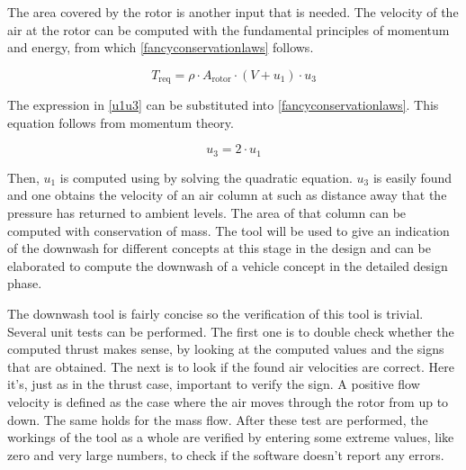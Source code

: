 The area covered by the rotor is another input that is needed. The velocity of the air at the rotor can be computed with the fundamental principles of momentum and energy, from which \autoref{fancyconservationlaws} follows.

\begin{equation}
\label{fancyconservationlaws}
    T_\text{req} = \rho\cdot A_\text{rotor}\cdot(V + u_1)\cdot u_3 
\end{equation}



The expression in \autoref{u1u3} can be substituted into \autoref{fancyconservationlaws}. This equation follows from momentum theory. 

\begin{equation}
\label{u1u3}
    u_3 = 2\cdot u_1
\end{equation}

Then, $u_1$ is computed using by solving the quadratic equation. $u_3$ is easily found and one obtains the velocity of an air column at such as distance away that the pressure has returned to ambient levels. The area of that column can be computed with conservation of mass. The tool will be used to give an indication of the downwash for different concepts at this stage in the design and can be elaborated to compute the downwash of a vehicle concept in the detailed design phase. 

The downwash tool is fairly concise so the verification of this tool is trivial. Several unit tests can be performed. The first one is to double check whether the computed thrust makes sense, by looking at the computed values and the signs that are obtained. The next is to look if the found air velocities are correct. Here it's, just as in the thrust case, important to verify the sign. A positive flow velocity is defined as the case where the air moves through the rotor from up to down. The same holds for the mass flow. After these test are performed, the workings of the tool as a whole are verified by entering some extreme values, like zero and very large numbers, to check if the software doesn't report any errors.   


